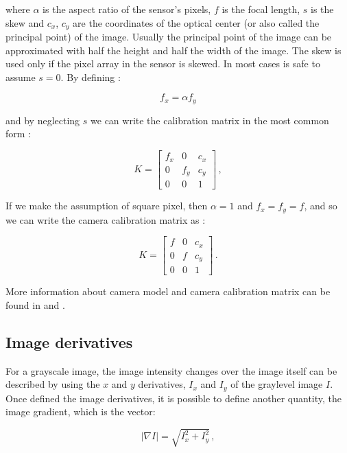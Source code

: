 where $\alpha$ is the aspect ratio of the sensor's pixels, $f$ is the focal length, $s$ is the skew and $c_x$, $c_y$ are the coordinates of the optical center (or also called the principal point) of the image. Usually the principal point of the image can be approximated with half the height and half the width of the image. The skew is used only if the pixel array in the sensor is skewed. In most cases is safe to assume $s = 0$.
By defining :

\begin{equation*}
  f_x = \alpha f_y
\end{equation*}

and by neglecting $s$ we can write the calibration matrix in the most common form :

\begin{equation*}
  K = \begin{bmatrix}
    f_x & 0   & c_x \\
    0   & f_y & c_y \\
    0   & 0   & 1
  \end{bmatrix} \,,
\end{equation*}

If we make the assumption of square pixel, then $\alpha = 1 $ and $ f_x = f_y = f$, and so we can write the camera calibration matrix as :

\begin{equation*}
  K = \begin{bmatrix}
    f & 0 & c_x \\
    0 & f & c_y \\
    0 & 0 & 1
  \end{bmatrix} \,.
\end{equation*}

More information about camera model and camera calibration matrix can be found in \cite{10.5555/861369} and \cite{Pollefeys2004}.

\subsection{Image derivatives}\label{sec:imagegradient}
For a grayscale image, the image intensity changes over the image itself can be described by using the $x$ and $y$ derivatives, $I_x$ and $I_y$ of the graylevel image $I$.
Once defined the image derivatives, it is possible to define another quantity, the image gradient, which is the vector:

\begin{equation*}
  |\nabla I| = \sqrt{I_x^2 + I_y^2} \,,
\end{equation*}

